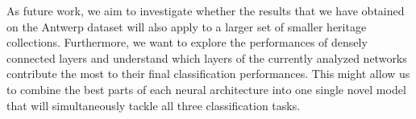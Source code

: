 As future work, we aim to investigate whether the results that we have obtained on the Antwerp dataset will also apply to a larger set of smaller heritage collections. Furthermore, we want to explore the performances of densely connected layers \cite{huang2017densely} and understand which layers of the currently analyzed networks contribute the most to their final classification performances. This might allow us to combine the best parts of each neural architecture into one single novel model that will simultaneously tackle all three classification tasks. 


